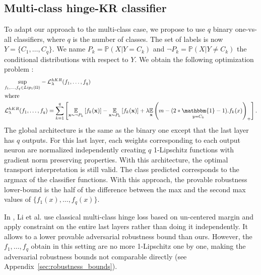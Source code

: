 \subsection{Multi-class hinge-KR classifier}
To adapt our approach to the multi-class case, we propose to use $q$ binary one-vs-all classifiers, where $q$ is the number of classes. The set of labels is now $Y=\{C_1,\ldots,C_q\}$. We name $P_k=\mathbb{P}(X|Y= C_k)$ and $\neg P_k=\mathbb{P}(X|Y\not = C_k)$ the  conditional  distributions  with  respect  to  $Y$. We obtain the following optimization problem :
\begin{equation}
\label{eq:hkr_multi}
\begin{split}
&\underset{f_1,\ldots,f_q \in Lip_1(\Omega)}{\text{sup}}-\mathcal{L}^{hKR}_\lambda(f_1,\ldots,f_q) \\
&\text{where}\\
&\mathcal{L}^{hKR}_\lambda(f_1,\ldots,f_q) = \sum_{k=1}^q \left[\underset{\textbf{x}  \sim \neg P_k}{\mathbb{E}} \left[f_k(\textbf{x})\right] -\underset{\textbf{x} \sim P_k}{\mathbb{E}}\left[f_k(\textbf{x})\right]   +\lambda\underset{\textbf{x}}{\mathbb{E}} \left(m-(2*\underset{y=C_k}{\mathbbm{1}} -1).f_k(x)  \right)_+ \right].
\end{split}
\end{equation}
The global architecture is the same as the binary one except that the last layer has $q$ outputs. For this last layer, each weights corresponding to each output neuron are normalized independently creating $q$ 1-Lipschitz functions with gradient norm preserving properties. With this architecture, the optimal transport interpretation is still valid. The class predicted corresponds to the argmax of the classifier functions. With this approach, the provable robustness lower-bound is the half of the difference between the max and the second max values of $\{f_1(x),\ldots,f_q(x)\}$.  

In \cite{li2019preventing}, Li et al. use classical multi-class hinge loss based on un-centered margin and apply constraint on the entire last layers rather than doing it independently. It allows to a lower provable adversarial robustness bound than ours. However, the $f_1,\ldots,f_q$ obtain in this setting are no more 1-Lipschitz one by one, making the adversarial robustness bounds not comparable directly (see Appendix~\ref{sec:robustness_bounds}).